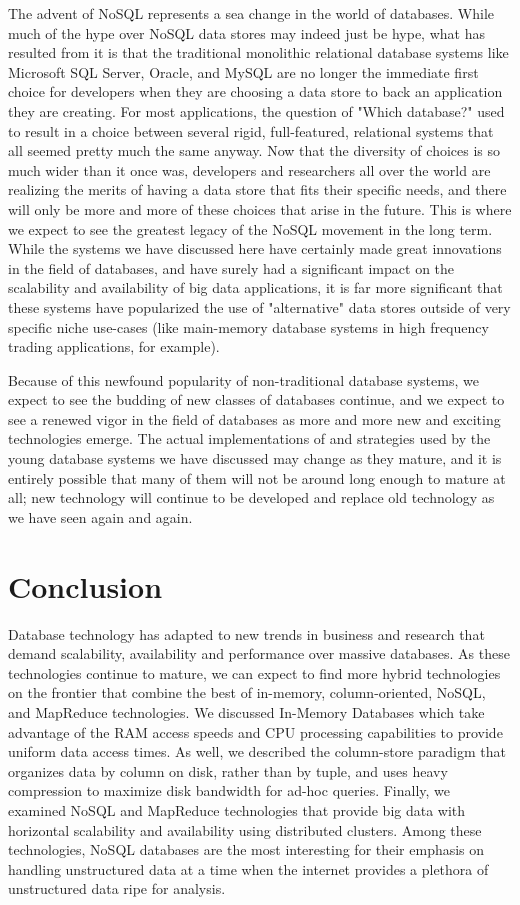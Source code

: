 \documentclass[11pt,a4paper]{report}
\begin{document}
The advent of NoSQL represents a sea change in the world of databases. While much of the hype over NoSQL data stores may indeed just be hype, what has resulted from it is that the traditional monolithic relational database systems like Microsoft SQL Server, Oracle, and MySQL are no longer the immediate first choice for developers when they are choosing a data store to back an application they are creating. For most applications, the question of "Which database?" used to result in a choice between several rigid, full-featured, relational systems that all seemed pretty much the same anyway. Now that the diversity of choices is so much wider than it once was, developers and researchers all over the world are realizing the merits of having a data store that fits their specific needs, and there will only be more and more of these choices that arise in the future. This is where we expect to see the greatest legacy of the NoSQL movement in the long term. While the systems we have discussed here have certainly made great innovations in the field of databases, and have surely had a significant impact on the scalability and availability of big data applications, it is far more significant that these systems have popularized the use of "alternative" data stores outside of very specific niche use-cases (like main-memory database systems in high frequency trading applications, for example).

Because of this newfound popularity of non-traditional database systems, we expect to see the budding of new classes of databases continue, and we expect to see a renewed vigor in the field of databases as more and more new and exciting technologies emerge. The actual implementations of and strategies used by the young database systems we have discussed may change as they mature, and it is entirely possible that many of them will not be around long enough to mature at all; new technology will continue to be developed and replace old technology as we have seen again and again.




\section{Conclusion}
Database technology has adapted to new trends in business and research that demand scalability, availability and performance over massive databases. As these technologies continue to mature, we can expect to find more hybrid technologies on the frontier that combine the best of in-memory, column-oriented, NoSQL, and MapReduce technologies. We discussed In-Memory Databases which take advantage of the RAM access speeds and CPU processing capabilities to provide uniform data access times. As well, we described the column-store paradigm that organizes data by column on disk, rather than by tuple, and uses heavy compression to maximize disk bandwidth for ad-hoc queries. Finally, we examined NoSQL and MapReduce technologies that provide big data with horizontal scalability and availability using distributed clusters. Among these technologies, NoSQL databases are the most interesting for their emphasis on handling unstructured data at a time when the internet provides a plethora of unstructured data ripe for analysis.
\pagebreak


\end{document}
